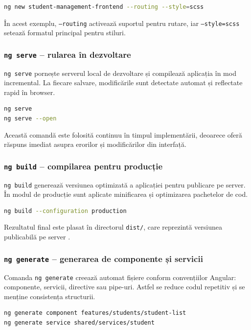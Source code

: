 \begin{lstlisting}[language=bash]
ng new student-management-frontend --routing --style=scss
\end{lstlisting}

În acest exemplu, \texttt{--routing} activează suportul pentru rutare, iar \texttt{--style=scss} setează formatul principal pentru stiluri.

\subsubsection{\texttt{ng serve} -- rularea în dezvoltare}
\texttt{ng serve} pornește serverul local de dezvoltare și compilează aplicația în mod incremental. La fiecare salvare, modificările sunt detectate automat și reflectate rapid în browser.

\begin{lstlisting}[language=bash]
ng serve
ng serve --open
\end{lstlisting}

Această comandă este folosită continuu în timpul implementării, deoarece oferă răspuns imediat asupra erorilor și modificărilor din interfață.

\subsubsection{\texttt{ng build} -- compilarea pentru producție}
\texttt{ng build} generează versiunea optimizată a aplicației pentru publicare pe server. În modul de producție sunt aplicate minificarea și optimizarea pachetelor de cod.

\begin{lstlisting}[language=bash]
ng build --configuration production
\end{lstlisting}

Rezultatul final este plasat în directorul \texttt{dist/}, care reprezintă versiunea publicabilă pe server \cite{google_angular_cli_2026}.

\subsubsection{\texttt{ng generate} -- generarea de componente și servicii}
Comanda \texttt{ng generate} creează automat fișiere conform convențiilor Angular: componente, servicii, directive sau pipe-uri. Astfel se reduce codul repetitiv și se menține consistența structurii.

\begin{lstlisting}[language=bash]
ng generate component features/students/student-list
ng generate service shared/services/student
\end{lstlisting}

